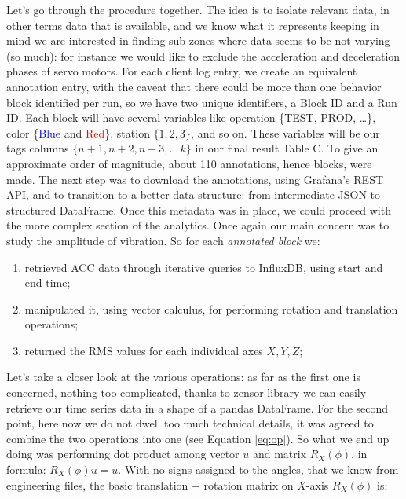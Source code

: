 Let's go through the procedure together. 
The idea is to isolate relevant data, in other terms data that is available, and we know what it represents keeping in mind we are interested in finding sub zones 
where data seems to be not varying (so much): for instance we would like to exclude the acceleration and deceleration phases of servo motors.
For each client log entry, we create an equivalent annotation entry, with the caveat that there could be more than one behavior block identified per run, so we have two unique identifiers, a Block ID and a Run ID. 
Each block will have several variables like operation \{TEST, PROD, \dots \}, color \{\textcolor{blue}{Blue} and \textcolor{red}{Red}\}, station $\{1,2,3\}$, and so on. 
These variables will be our tags columns $\{n+1, n+2, n+3, \dots\, k\}$ in our final result Table C. To give an approximate order of magnitude, about 110 annotations, hence blocks, were made.
The next step was to download the annotations, using Grafana's REST API, and to transition to a better data structure: from intermediate JSON to structured DataFrame.
Once this metadata was in place, we could proceed with the more complex section of the analytics.
Once again our main concern was to study the amplitude of vibration. So for each \emph{annotated block} we: 
\begin{enumerate}
    \item retrieved ACC data through iterative queries to InfluxDB, using start and end time;
    \item manipulated it, using vector calculus, for performing rotation and translation operations;
    \item returned the \ac{RMS} values for each individual axes $X,Y,Z$;
\end{enumerate}
Let's take a closer look at the various operations: %
as far as the first one is concerned, nothing too complicated, thanks to zensor library we can easily retrieve our time series data in a shape of a pandas DataFrame.
For the second point, here now we do not dwell too much technical details, it was agreed to combine the two operations into one (see Equation \ref{eq:op}).
So what we end up doing was performing dot product among vector $u$ and matrix $R_X(\phi)$, in formula: $R_X(\phi)u = u$.
With no signs assigned to the angles, that we know from engineering files, the basic translation $+$ rotation matrix on $X$-axis $R_X(\phi)$ is:
